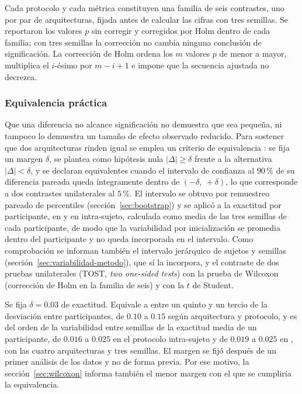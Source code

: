 Cada protocolo y cada métrica constituyen una familia de seis contrastes, uno por par de
arquitecturas, fijada antes de calcular las cifras con tres semillas. Se reportaron los valores $p$
sin corregir y corregidos por Holm \cite{holm1979} dentro de cada familia; con tres semillas la
corrección no cambia ninguna conclusión de significación. La corrección de Holm ordena
los $m$ valores $p$ de menor a mayor, multiplica el $i$-ésimo por $m - i + 1$ e impone que
la secuencia ajustada no decrezca.

\subsubsection{Equivalencia práctica}
\label{sec:equivalencia}

Que una diferencia no alcance significación no demuestra que sea pequeña, ni tampoco lo
demuestra un tamaño de efecto observado reducido. Para sostener que dos arquitecturas rinden
igual se emplea un criterio de equivalencia \cite{schuirmann1987,lakens2017}: se fija un
margen $\delta$, se plantea como hipótesis nula $|\Delta| \geq \delta$ frente a la
alternativa $|\Delta| < \delta$, y se declaran
equivalentes cuando el intervalo de confianza al $90$\,\% de su diferencia pareada queda
íntegramente dentro de $(-\delta,\ +\delta)$, lo que corresponde a dos contrastes unilaterales
al $5$\,\%. El intervalo se obtuvo por remuestreo pareado de percentiles
(sección~\ref{sec:bootstrap}) y se aplicó a la exactitud por participante, en \loso{} y en
intra-sujeto, calculada como media de las tres semillas de cada participante, de modo que la
variabilidad por inicialización se promedia dentro del participante y no queda incorporada en el
intervalo. Como comprobación se informan también el intervalo jerárquico de sujetos y semillas
(sección~\ref{sec:variabilidad-metodo}), que sí la incorpora, y el contraste de dos pruebas unilaterales (TOST, \textit{two one-sided tests}) con la prueba de
Wilcoxon (corrección de Holm en la familia de seis) y con la $t$ de Student.

Se fija $\delta = 0.03$ de exactitud. Equivale a entre un quinto y un tercio de la
desviación entre participantes, de $0.10$ a $0.15$ según arquitectura y protocolo, y es del
orden de la variabilidad entre semillas de la exactitud media de un participante, de
$0.016$ a $0.025$ en el protocolo intra-sujeto y de $0.019$ a $0.025$ en \loso{}, con las cuatro
arquitecturas y tres semillas. El margen se
fijó después de un primer análisis de los datos y no de forma previa. Por ese motivo, la
sección~\ref{sec:wilcoxon} informa también el menor margen con el que se cumpliría la
equivalencia.

